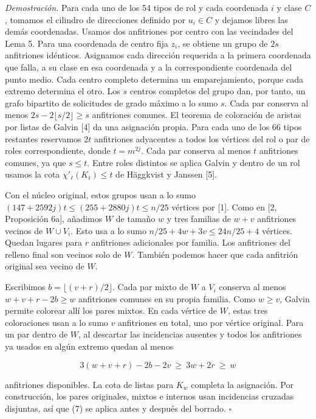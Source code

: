 \documentclass[spanish,11pt,a4paper]{article}
\begin{document}
\emph{Demostración.} Para cada uno de los 54 tipos de rol y cada coordenada \(i\) y clase \(C\), tomamos el cilindro de direcciones definido por \(u_i\in C\) y dejamos libres las demás coordenadas. Usamos dos anfitriones por centro con las vecindades del Lema 5. Para una coordenada de centro fija \(z_i\), se obtiene un grupo de \(2s\) anfitriones idénticos. Asignamos cada dirección requerida a la primera coordenada que falla, a su clase en esa coordenada y a la correspondiente coordenada del punto medio. Cada centro completo determina un emparejamiento, porque cada extremo determina el otro. Los \(s\) centros completos del grupo dan, por tanto, un grafo bipartito de solicitudes de grado máximo a lo sumo \(s\). Cada par conserva al menos \(2s-2\lfloor s/2\rfloor\ge s\) anfitriones comunes. El teorema de coloración de aristas por listas de Galvin {[}4{]} da una asignación propia. Para cada uno de los 66 tipos restantes reservamos \(2t\) anfitriones adyacentes a todos los vértices del rol o par de roles correspondiente, donde \(t=m^{2j}\). Cada par conserva al menos \(t\) anfitriones comunes, ya que \(s\le t\). Entre roles distintos se aplica Galvin y dentro de un rol usamos la cota \(\chi'_\ell(K_t)\le t\) de Häggkvist y Janssen {[}5{]}.

Con el núcleo original, estos grupos usan a lo sumo \((147+2592j)t\le(255+2880j)t\le n/25\) vértices por {[}1{]}. Como en {[}2, Proposición 6a{]}, añadimos \(W\) de tamaño \(w\) y tres familias de \(w+v\) anfitriones vecinos de \(W\cup V_i\). Esto usa a lo sumo \(n/25+4w+3v\le24n/25+4\) vértices. Quedan lugares para \(r\) anfitriones adicionales por familia. Los anfitriones del relleno final son vecinos solo de \(W\). También podemos hacer que cada anfitrión original sea vecino de \(W\).

Escribimos \(b=\lfloor(v+r)/2\rfloor\). Cada par mixto de \(W\) a \(V_i\) conserva al menos \(w+v+r-2b\ge w\) anfitriones comunes en su propia familia. Como \(w\ge v\), Galvin permite colorear allí los pares mixtos. En cada vértice de \(W\), estas tres coloraciones usan a lo sumo \(v\) anfitriones en total, uno por vértice original. Para un par dentro de \(W\), al descartar las incidencias ausentes y todos los anfitriones ya usados en algún extremo quedan al menos

\[3(w+v+r)-2b-2v\ \ge\ 3w+2r\ \ge\ w\]

anfitriones disponibles. La cota de listas para \(K_w\) completa la asignación. Por construcción, los pares originales, mixtos e internos usan incidencias cruzadas disjuntas, así que (7) se aplica antes y después del borrado. \(\square\)
\end{document}
